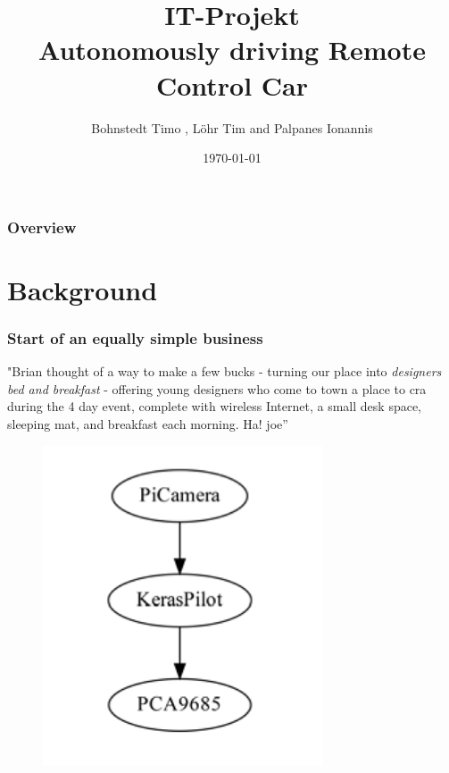 \documentclass{beamer}
\title{IT-Projekt \\ Autonomously driving Remote Control Car} %
\author{Bohnstedt Timo ,
      L\"ohr Tim and Palpanes Ionannis\\%
      }
\institute[Computer Science| Prof. Dr. Florian Gallwitz] %
{
Georg Simon Ohm University of Applied Science\\ %
\medskip
\textit{IT Project Presentation} 
}
\date{\today} %
\begin{document}
\begin{frame}
\titlepage %
\end{frame}
\begin{frame}
\frametitle{Overview} %
\tableofcontents %
\end{frame}
%

\section{Background}

\begin{frame}
\frametitle{Start of an equally simple business}
"Brian thought of a way to make a few bucks - turning
our place into \textit{designers bed and breakfast} - offering young
designers who come to town a place to cra during the 4 day
event, complete with wireless Internet, a small desk space,
sleeping mat, and breakfast each morning. Ha!
joe”
\begin{figure}
\includegraphics[width=0.4\linewidth]{photo/autonom}
\end{figure}
\end{frame}
\end{document}
